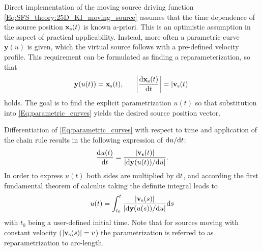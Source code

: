 Direct implementation of the moving source driving function \eqref{Eq:SFS_theory:25D_KI_moving_source} assumes that the time dependence of the source position $\mathbf{x}_{\mathrm{s}}(t)$ is known a-priori. 
This is an optimistic assumption in the aspect of practical applicability. 
Instead, more often a parametric curve $\mathbf{y}(u)$ is given, which the virtual source follows with a pre-defined velocity profile.
This requirement can be formulated as finding a reparameterization, so that 
\begin{equation}
\mathbf{y}(u(t)) = \mathbf{x}_{\mathrm{s}}(t), \hspace{6mm} \left| \frac{\mathrm{d} \mathbf{x}_{\mathrm{s}}(t)}{\mathrm{d} t} \right| = |\mathbf{v}_{\mathrm{s}}(t)| 
\label{Eq:parametric_curves}
\end{equation}
holds. 
The goal is to find the explicit parametrization $u(t)$ so that substitution into \eqref{Eq:parametric_curves} yields the desired source position vector.

Differentiation of \eqref{Eq:parametric_curves} with respect to time and application of the chain rule results in the following expression of $\mathrm{d} u / \mathrm{d} t$:
%
\begin{equation}
 \frac{\mathrm{d} u(t) }{\mathrm{d} t} = \frac{|\mathbf{v}_{\mathrm{s}}(t)|}{\left| \mathrm{d} \mathbf{y}(u(t)) / \mathrm{d} u \right|}.
\end{equation}
In order to express $u(t)$ both sides are multiplied by $\mathrm{d} t$, and according the first fundamental theorem of calculus taking the definite integral leads to
\begin{equation}
u(t) = \int_{t_0}^{t} \frac{|\mathbf{v}_{\mathrm{s}}(s)|}{\left| \mathrm{d} \mathbf{y}(u(s)) / \mathrm{d} u \right|} \mathrm{d} s
\label{Eq:pt}
\end{equation}
with $t_0$ being a user-defined initial time.
Note that for sources moving with constant velocity ($|\mathbf{v}_{\mathrm{s}}(s)| = v$) the parametrization is referred to as reparametrization to arc-length.

